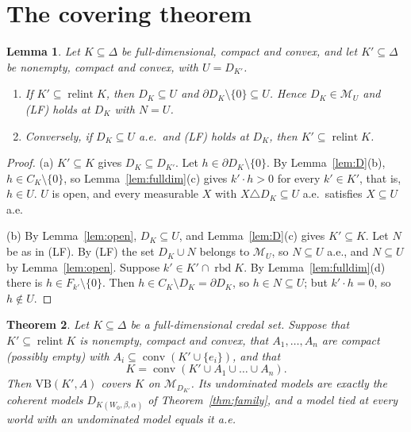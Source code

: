 \documentclass[11pt]{article}
\newcommand{\M}{\mathcal{M}}
\newcommand{\VB}{\mathrm{VB}}
\DeclareMathOperator{\conv}{conv}
\DeclareMathOperator{\relint}{relint}
\DeclareMathOperator{\rbd}{rbd}
\theoremstyle{plain}
\newtheorem{theorem}{Theorem}[section]
\newtheorem{lemma}[theorem]{Lemma}
\theoremstyle{definition}
\theoremstyle{remark}
\begin{document}
\section{The covering theorem}\label{sec:cover}

\begin{lemma}\label{lem:LF}
Let $K\subseteq\Delta$ be full-dimensional, compact and convex, and let $K'\subseteq\Delta$
be nonempty, compact and convex, with $U=D_{K'}$.
\begin{enumerate}[label=(\alph*)]
  \item If $K'\subseteq\relint K$, then $D_K\subseteq U$ and $\partial D_K\setminus\{0\}
  \subseteq U$. Hence $D_K\in\M_U$ and (LF) holds at $D_K$ with $N=U$.
  \item Conversely, if $D_K\subseteq U$ a.e.\ and (LF) holds at $D_K$, then $K'\subseteq
  \relint K$.
\end{enumerate}
\end{lemma}

\begin{proof}
(a) $K'\subseteq K$ gives $D_K\subseteq D_{K'}$. Let $h\in\partial D_K\setminus\{0\}$. By
Lemma~\ref{lem:D}(b), $h\in C_K\setminus\{0\}$, so Lemma~\ref{lem:fulldim}(c) gives
$k'\cdot h>0$ for every $k'\in K'$, that is, $h\in U$. $U$ is open, and every measurable
$X$ with $X\triangle D_K\subseteq U$ a.e.\ satisfies $X\subseteq U$ a.e.

(b) By Lemma~\ref{lem:open}, $D_K\subseteq U$, and Lemma~\ref{lem:D}(c) gives
$K'\subseteq K$. Let $N$ be as in (LF). By (LF) the set $D_K\cup N$ belongs to $\M_U$, so
$N\subseteq U$ a.e., and $N\subseteq U$ by Lemma~\ref{lem:open}. Suppose $k'\in K'\cap\rbd K$. By
Lemma~\ref{lem:fulldim}(d) there is $h\in F_{k'}\setminus\{0\}$. Then $h\in C_K\setminus
D_K=\partial D_K$, so $h\in N\subseteq U$; but $k'\cdot h=0$, so $h\notin U$.
\end{proof}

\begin{theorem}\label{thm:cover}
Let $K\subseteq\Delta$ be a full-dimensional credal set. Suppose that $K'\subseteq\relint
K$ is nonempty, compact and convex, that $A_1,\dots,A_n$ are compact (possibly empty)
with $A_i\subseteq\conv(K'\cup\{e_i\})$, and that
\[
  K=\conv(K'\cup A_1\cup\dots\cup A_n).
\]
Then $\VB(K',A)$ covers $K$ on $\M_{D_{K'}}$. Its undominated models are exactly the
coherent models $D_{K(W_0,\beta,\alpha)}$ of Theorem~\ref{thm:family}, and a model tied at
every world with an undominated model equals it a.e.
\end{theorem}
\end{document}
